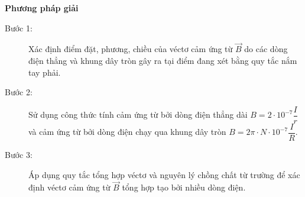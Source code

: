 \textbf{Phương pháp giải}
\begin{description}
	\item[Bước 1:] Xác định điểm đặt, phương, chiều của véctơ cảm ứng từ $\vec{B}$ do các dòng điện thẳng và khung dây tròn gây ra tại điểm đang xét bằng quy tắc nắm tay phải.	
	\item[Bước 2:] Sử dụng công thức tính cảm ứng từ bởi dòng điện thẳng dài $B=2\cdot 10^{-7}\dfrac{I}{r}$ và cảm ứng từ bởi dòng điện chạy qua khung dây tròn $B=2\pi\cdot N \cdot 10^{-7}\dfrac{I}{R}$. 
	\item[Bước 3:] Áp dụng quy tắc tổng hợp véctơ và nguyên lý chồng chất từ trường để xác định véctơ cảm ứng từ $\vec{B}$ tổng hợp tạo bởi nhiều dòng điện.
\end{description}
\vspace{1em}
{}
